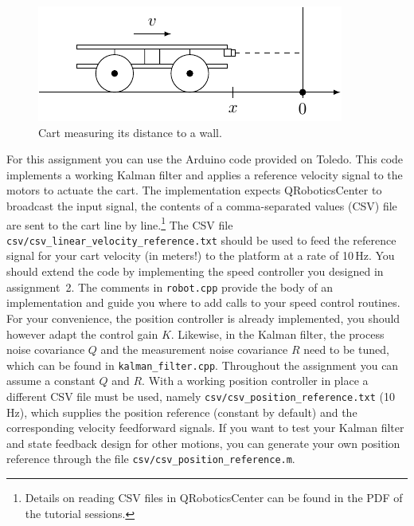 \documentclass[10pt,a4paper]{article}
\begin{document}
\begin{figure}[h]
\centering
\includegraphics[scale=1]{figures/1dcart.pdf}
\caption{Cart measuring its distance to a wall.}
\end{figure}

For this assignment you can use the Arduino code provided on Toledo. This code implements a working Kalman filter and applies a reference velocity signal to the motors to actuate the cart. The implementation expects QRoboticsCenter to broadcast the input signal, the contents of a comma-separated values (CSV) file are sent to the cart line by line.\footnote{Details on reading CSV files in QRoboticsCenter can be found in the PDF of the tutorial sessions.} The CSV file \verb"csv/csv_linear_velocity_reference.txt" should be used to feed the reference signal for your cart velocity (in meters!) to the platform at a rate of 10\,Hz. You should extend the code by implementing the speed controller you designed in assignment~2. The comments in \verb"robot.cpp" provide the body of an implementation and guide you where to add calls to your speed control routines. For your convenience, the position controller is already implemented, you should however adapt the control gain $K$. Likewise, in the Kalman filter, the process noise covariance $Q$ and the measurement noise covariance $R$ need to be tuned, which can be found in \verb"kalman_filter.cpp". Throughout the assignment you can assume a constant $Q$ and $R$. With a working position controller in place a different CSV file must be used, namely \verb"csv/csv_position_reference.txt" (10\,Hz), which supplies the position reference (constant by default) and the corresponding velocity feedforward signals. If you want to test your Kalman filter and state feedback design for other motions, you can generate your own position reference through the file \verb"csv/csv_position_reference.m".
\end{document}
